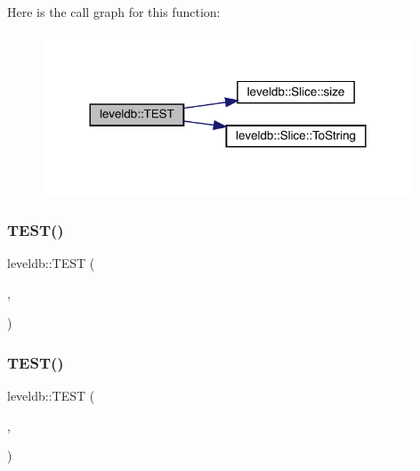 Here is the call graph for this function\+:
\nopagebreak
\begin{figure}[H]
\begin{center}
\leavevmode
\includegraphics[width=312pt]{namespaceleveldb_a38772a8b86ea7658430b1fa2f1a5d83e_cgraph}
\end{center}
\end{figure}
\mbox{\label{namespaceleveldb_a34a511836c47efe81202280115290934}} 
\subsubsection{\texorpdfstring{TEST()}{TEST()}\hspace{0.1cm}{\footnotesize\ttfamily [88/102]}}
{\footnotesize\ttfamily leveldb\+::\+T\+E\+ST (\begin{DoxyParamCaption}\item[{\mbox{\hyperlink{classleveldb_1_1_d_b_test}{D\+B\+Test}}}]{,  }\item[{Manual\+Compaction}]{ }\end{DoxyParamCaption})}

\mbox{\label{namespaceleveldb_a88d6fdcb16ed4edc65da40f383e6f23b}} 
\subsubsection{\texorpdfstring{TEST()}{TEST()}\hspace{0.1cm}{\footnotesize\ttfamily [89/102]}}
{\footnotesize\ttfamily leveldb\+::\+T\+E\+ST (\begin{DoxyParamCaption}\item[{\mbox{\hyperlink{classleveldb_1_1_d_b_test}{D\+B\+Test}}}]{,  }\item[{D\+B\+Open\+\_\+\+Options}]{ }\end{DoxyParamCaption})}

